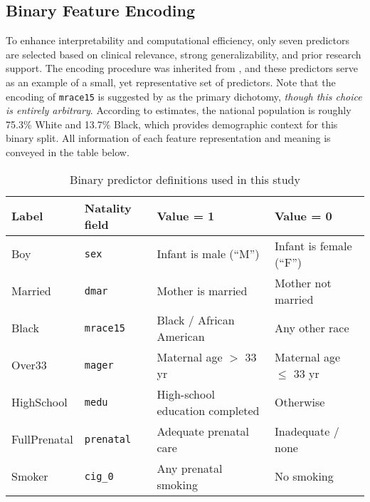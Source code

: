 \subsection{Binary Feature Encoding}
\label{sec:ch2-feature-encoding}

To enhance interpretability and computational efficiency, only seven predictors are selected based on clinical relevance, strong generalizability,  and prior research support. The encoding procedure was inherited from \textcite{jain2024}, and these predictors serve as an example of a small, yet representative set of predictors. Note that the encoding of \texttt{mrace15} is suggested by \textcite{jain2024, marchofdimes2024} as the primary dichotomy, \emph{though this choice is entirely arbitrary}.  According to \citeyear{census_usa} \textcite{census_usa} estimates, the national population is roughly 75.3\% White and 13.7\% Black, which provides demographic context for this binary split. All information of each feature representation and meaning is conveyed in the table below.

\begin{table}[ht]
\centering         %
\small             %
\caption{Binary predictor definitions used in this study}
\begin{tabular}{@{}llll@{}}
\toprule
\textbf{Label} & \textbf{Natality field} & \textbf{Value = 1} & \textbf{Value = 0} \\ \midrule
Boy          & \texttt{sex}      & Infant is male (“M”)                     & Infant is female (“F”) \\
Married      & \texttt{dmar}     & Mother is married                        & Mother not married     \\
Black        & \texttt{mrace15}  & Black / African American                 & Any other race         \\
Over33       & \texttt{mager}    & Maternal age $>$ 33 yr                   & Maternal age $\le$ 33 yr \\
HighSchool   & \texttt{medu}     & High-school education completed          & Otherwise              \\
FullPrenatal & \texttt{prenatal} & Adequate prenatal care                   & Inadequate / none      \\
Smoker       & \texttt{cig\_0}   & Any prenatal smoking                     & No smoking             \\ \bottomrule
\end{tabular}
\end{table}



